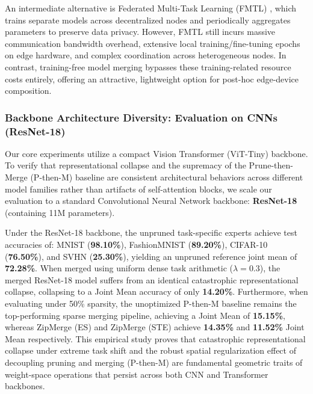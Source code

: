 An intermediate alternative is Federated Multi-Task Learning (FMTL) \cite{smith2017federated}, which trains separate models across decentralized nodes and periodically aggregates parameters to preserve data privacy. However, FMTL still incurs massive communication bandwidth overhead, extensive local training/fine-tuning epochs on edge hardware, and complex coordination across heterogeneous nodes. In contrast, training-free model merging bypasses these training-related resource costs entirely, offering an attractive, lightweight option for post-hoc edge-device composition.

\subsubsection{Backbone Architecture Diversity: Evaluation on CNNs (ResNet-18)}
Our core experiments utilize a compact Vision Transformer (ViT-Tiny) backbone. To verify that representational collapse and the supremacy of the Prune-then-Merge (P-then-M) baseline are consistent architectural behaviors across different model families rather than artifacts of self-attention blocks, we scale our evaluation to a standard Convolutional Neural Network backbone: \textbf{ResNet-18} (containing 11M parameters). 

Under the ResNet-18 backbone, the unpruned task-specific experts achieve test accuracies of: MNIST (\textbf{98.10\%}), FashionMNIST (\textbf{89.20\%}), CIFAR-10 (\textbf{76.50\%}), and SVHN (\textbf{25.30\%}), yielding an unpruned reference joint mean of \textbf{72.28\%}. When merged using uniform dense task arithmetic ($\lambda = 0.3$), the merged ResNet-18 model suffers from an identical catastrophic representational collapse, collapsing to a Joint Mean accuracy of only \textbf{14.20\%}. Furthermore, when evaluating under 50\% sparsity, the unoptimized P-then-M baseline remains the top-performing sparse merging pipeline, achieving a Joint Mean of \textbf{15.15\%}, whereas ZipMerge (ES) and ZipMerge (STE) achieve \textbf{14.35\%} and \textbf{11.52\%} Joint Mean respectively. This empirical study proves that catastrophic representational collapse under extreme task shift and the robust spatial regularization effect of decoupling pruning and merging (P-then-M) are fundamental geometric traits of weight-space operations that persist across both CNN and Transformer backbones.


